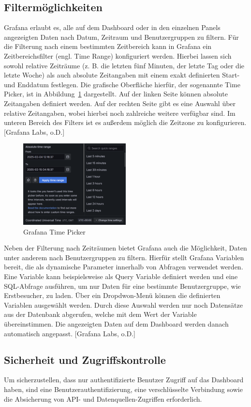 \subsection{Filtermöglichkeiten}
Grafana erlaubt es, alle auf dem Dashboard oder in den einzelnen Panels angezeigten Daten nach Datum, Zeitraum und Benutzergruppen zu filtern. Für die Filterung nach einem bestimmten Zeitbereich kann in Grafana ein Zeitbereichsfilter (engl. Time Range) konfiguriert werden. Hierbei lassen sich sowohl relative Zeiträume (z. B. die letzten fünf Minuten, der letzte Tag oder die letzte Woche) als auch absolute Zeitangaben mit einem exakt definierten Start- und Enddatum festlegen. Die grafische Oberfläche hierfür, der sogenannte Time Picker, ist in Abbildung~\ref{fig:timerange} dargestellt. Auf der linken Seite können absolute Zeitangaben definiert werden. Auf der rechten Seite gibt es eine Auswahl über relative Zeitangaben, wobei hierbei noch zahlreiche weitere verfügbar sind. Im unteren Bereich des Filters ist es außerdem möglich die Zeitzone zu konfigurieren. [Grafana Labs, o.D.]

\begin{figure}[h]
    \centering
    \includegraphics[width=0.5\textwidth]{images/timerange.png}
    \caption{Grafana Time Picker}%
    \label{fig:timerange}%
\end{figure}

Neben der Filterung nach Zeiträumen bietet Grafana auch die Möglichkeit, Daten unter anderem nach Benutzergruppen zu filtern. Hierfür stellt Grafana Variablen bereit, die als dynamische Parameter innerhalb von Abfragen verwendet werden. Eine Variable kann beispielsweise als Query Variable definiert werden und eine SQL-Abfrage ausführen, um nur Daten für eine bestimmte Benutzergruppe, wie Erstbesucher, zu laden. Über ein Dropdwon-Menü können die definierten Variablen ausgewählt werden. Durch diese Auswahl werden nur noch Datensätze aus der Datenbank abgerufen, welche mit dem Wert der Variable übereinstimmen. Die angezeigten Daten auf dem Dashboard werden danach automatisch angepasst. [Grafana Labs, o.D.]

\subsection{Sicherheit und Zugriffskontrolle}
Um sicherzustellen, dass nur authentifizierte Benutzer Zugriff auf das Dashboard haben, sind eine Benutzerauthentifizierung, eine verschlüsselte Verbindung sowie die Absicherung von API- und Datenquellen-Zugriffen erforderlich.